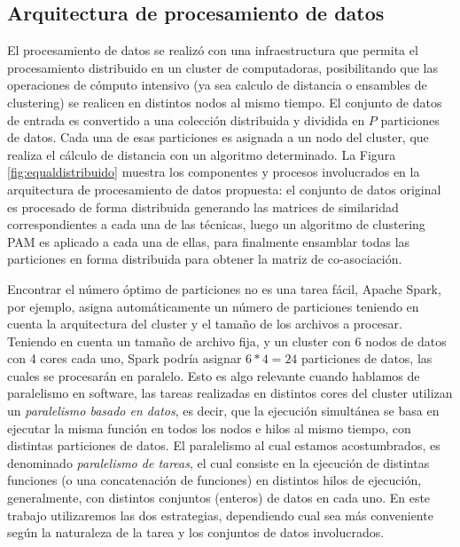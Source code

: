 \subsection{Arquitectura de procesamiento de datos}

El procesamiento de datos se realizó con una infraestructura que permita el procesamiento distribuido en un cluster de computadoras, posibilitando que las operaciones de cómputo intensivo (ya sea calculo de distancia o ensambles de clustering) se realicen en distintos nodos al mismo tiempo. El conjunto de datos de entrada es convertido a una colección distribuida y dividida en \(P\) particiones de datos. Cada una de esas particiones es asignada a un nodo del cluster, que realiza el cálculo de distancia con un algoritmo determinado. La Figura \ref{fig:equaldistribuido} muestra los componentes y procesos involucrados en la arquitectura de procesamiento de datos propuesta: el conjunto de datos original es procesado de forma distribuida generando las matrices de similaridad correspondientes a cada una de las técnicas, luego un algoritmo de clustering PAM es aplicado a cada una de ellas, para finalmente ensamblar todas las particiones en forma distribuida para obtener la matriz de co-asociación.

\bigskip Encontrar el número óptimo de particiones no es una tarea fácil, Apache Spark, por ejemplo, asigna automáticamente un número de particiones teniendo en cuenta la arquitectura del cluster y el tamaño de los archivos a procesar. Teniendo en cuenta un tamaño de archivo fija, y un cluster con 6 nodos de datos con 4 cores cada uno, Spark podría asignar \(6*4=24\) particiones de datos, las cuales se procesarán en paralelo. Esto es algo relevante cuando hablamos de paralelismo en software, las tareas realizadas en distintos cores del cluster utilizan un \textit{paralelismo basado en datos}, es decir, que la ejecución simultánea se basa en ejecutar la misma función en todos los nodos e hilos al mismo tiempo, con distintas particiones de datos. El paralelismo al cual estamos acostumbrados, es denominado \textit{paralelismo de tareas}, el cual consiste en la ejecución de distintas funciones (o una concatenación de funciones) en distintos hilos de ejecución, generalmente, con distintos conjuntos (enteros) de datos en cada uno. En este trabajo utilizaremos las dos estrategias, dependiendo cual sea más conveniente según la naturaleza de la tarea y los conjuntos de datos involucrados.

